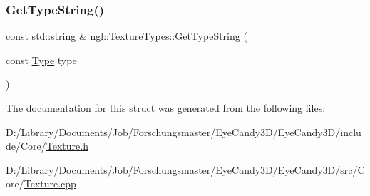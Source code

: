 \subsubsection{\texorpdfstring{Get\+Type\+String()}{GetTypeString()}}
{\footnotesize\ttfamily const std\+::string \& ngl\+::\+Texture\+Types\+::\+Get\+Type\+String (\begin{DoxyParamCaption}\item[{const \mbox{\hyperlink{structngl_1_1_texture_types_a1e2e79adc39e35979a635bfc6fd37d54}{Type}}}]{type }\end{DoxyParamCaption})\hspace{0.3cm}{\ttfamily [static]}}



The documentation for this struct was generated from the following files\+:\begin{DoxyCompactItemize}
\item 
D\+:/\+Library/\+Documents/\+Job/\+Forschungsmaster/\+Eye\+Candy3\+D/\+Eye\+Candy3\+D/include/\+Core/\mbox{\hyperlink{_texture_8h}{Texture.\+h}}\item 
D\+:/\+Library/\+Documents/\+Job/\+Forschungsmaster/\+Eye\+Candy3\+D/\+Eye\+Candy3\+D/src/\+Core/\mbox{\hyperlink{_texture_8cpp}{Texture.\+cpp}}\end{DoxyCompactItemize}
